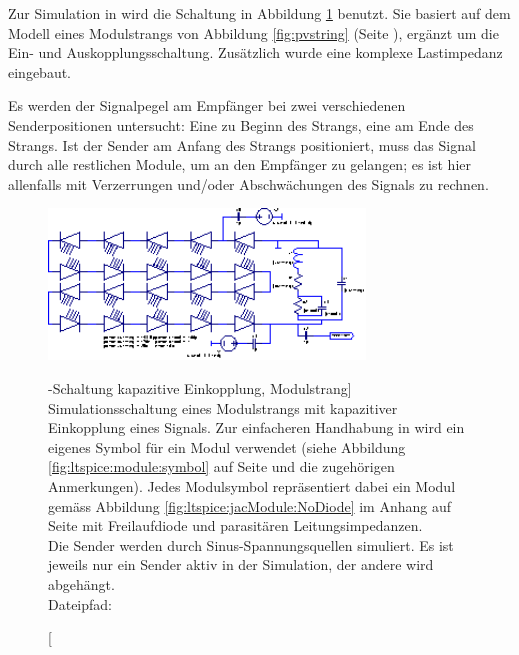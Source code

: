 Zur   Simulation   in     wird   die   Schaltung  in   Abbildung
\ref{fig:ltspice:capacitive:string} benutzt. Sie basiert  auf dem Modell eines
Modulstrangs von Abbildung  \ref{fig:pvstring} (Seite \pageref{fig:pvstring}),
erg\"anzt  um  die  Ein-  und  Auskopplungsschaltung. Zus\"atzlich  wurde  eine
komplexe Lastimpedanz eingebaut.

Es werden der Signalpegel am Empf\"anger bei zwei verschiedenen Senderpositionen
untersucht: Eine zu Beginn des Strangs, eine am Ende des Strangs. Ist der Sender
am Anfang des Strangs positioniert, muss das Signal durch alle restlichen Module,
um an den Empf\"anger zu gelangen; es ist hier allenfalls mit Verzerrungen und/oder
Abschw\"achungen des Signals zu rechnen.


\begin{figure}[h!tb]
    \centering
    \includegraphics[width=0.75\textwidth]{images/ltspice/jac/capacitive.eps}
    \caption
    [-Schaltung kapazitive Einkopplung, Modulstrang]
    {%
        Simulationsschaltung     eines     Modulstrangs    mit     kapazitiver
        Einkopplung    eines    Signals. Zur   einfacheren    Handhabung    in
           wird    ein   eigenes   Symbol   f\"ur    ein   Modul
        verwendet   (siehe   Abbildung   \ref{fig:ltspice:module:symbol}   auf
        Seite   \pageref{fig:ltspice:module:symbol}   und  die   zugeh\"origen
        Anmerkungen).   Jedes  Modulsymbol  repr\"asentiert  dabei  ein  Modul
        gem\"ass Abbildung  \ref{fig:ltspice:jacModule:NoDiode} im  Anhang auf
        Seite  \pageref{fig:ltspice:jacModule:NoDiode}  mit Freilaufdiode  und
        parasit\"aren Leitungsimpedanzen.\protect\\
        Die  Sender  werden  durch  Sinus-Spannungsquellen  simuliert. Es  ist
        jeweils  nur ein  Sender  aktiv  in der  Simulation,  der andere  wird
        abgeh\"angt.\protect\\
        Dateipfad: %
    }
    \label{fig:ltspice:capacitive:string}
\end{figure}

